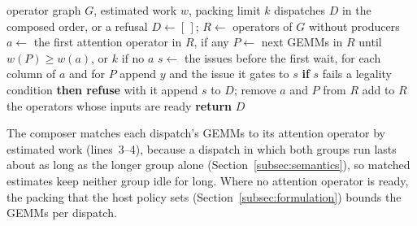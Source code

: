 \begin{algorithm}[t]
\caption{The composer, for one prompt length.}
\label{alg:compose}
\small
\begin{algorithmic}[1]
\renewcommand{\algorithmicrequire}{\textbf{Input:}}
\renewcommand{\algorithmicensure}{\textbf{Output:}}
\REQUIRE operator graph $G$, estimated work $w$, packing limit $k$
\ENSURE dispatches $D$ in the composed order, or a refusal
\STATE $D \gets [\,]$; $R \gets$ operators of $G$ without producers
\STATE $a \gets$ the first attention operator in $R$, if any
\STATE $P \gets$ next GEMMs in $R$ until $w(P) \ge w(a)$, or $k$ if no $a$
\STATE $s \gets$ the issues before the first wait, for each column of $a$ and for $P$
\STATE append $y$ and the issue it gates to $s$
\ENDFOR
\STATE \textbf{if} $s$ fails a legality condition \textbf{then refuse} with it
\STATE append $s$ to $D$; remove $a$ and $P$ from $R$
\STATE add to $R$ the operators whose inputs are ready
\ENDWHILE
\STATE \textbf{return} $D$
\end{algorithmic}
\end{algorithm}

The composer matches each dispatch's GEMMs to its attention operator by estimated work (lines~\mbox{3--4}), because a dispatch in which both groups run lasts about as long as the longer group alone (Section~\ref{subsec:semantics}), so matched estimates keep neither group idle for long.
Where no attention operator is ready, the packing that the host policy sets (Section~\ref{subsec:formulation}) bounds the GEMMs per dispatch.


